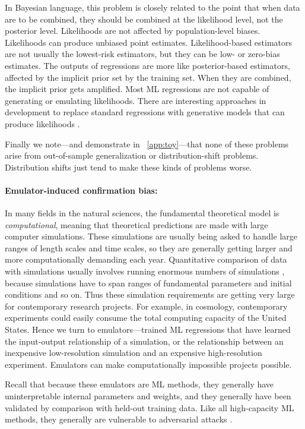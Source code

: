 \documentclass[10pt]{article}
\begin{document}
In Bayesian language, this problem is closely related to the point that when data are to be combined, they should be combined at the likelihood level, not the posterior level.
Likelihoods are not affected by population-level biases.
Likelihoods can produce unbiased point estimates.
Likelihood-based estimators are not usually the lowest-risk estimators, but they can be low- or zero-bias estimates.
The outputs of regressions are more like posterior-based estimators, affected by the implicit prior set by the training set.
When they are combined, the implicit prior gets amplified.
Most ML regressions are not capable of generating or emulating likelihoods.
There are interesting approaches in development to replace standard regressions with generative models that can produce likelihoods \cite{cannon, biwei, likelihood_ratio}.

Finally we note---and demonstrate in \appendixname~\ref{app:toy}---that none of these problems arise from out-of-sample generalization or distribution-shift problems.
Distribution shifts just tend to make these kinds of problems worse.

\paragraph{Emulator-induced confirmation bias:}
In many fields in the natural sciences, the fundamental theoretical model is \emph{computational}, meaning that theoretical predictions are made with large computer simulations.
These simulations are usually being asked to handle large ranges of length scales and time scales, so they are generally getting larger and more computationally demanding each year.
Quantitative comparison of data with simulations usually involves running enormous numbers of simulations \cite{abc}, because simulations have to span ranges of fundamental parameters and initial conditions and so on.
Thus these simulation requirements are getting very large for contemporary research projects.
For example, in cosmology, contemporary experiments could easily consume the total computing capacity of the United States.
Hence we turn to emulators---trained ML regressions that have learned the input-output relationship of a simulation, or the relationship between an inexpensive low-resolution simulation and an expensive high-resolution experiment.
Emulators can make computationally impossible projects possible.

Recall that because these emulators are ML methods, they generally have uninterpretable internal parameters and weights, and they generally have been validated by comparison with held-out training data.
Like all high-capacity ML methods, they generally are vulnerable to adversarial attacks \cite{adversarial1}.
\end{document}
